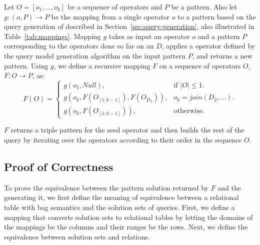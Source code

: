 \vspace*{-4pt}
\begin{sloppypar}
\begin{definition}
	Let $O = [o_1, \dots, o_k]$ be a sequence of \rdfframes operators and $P$ be a \sparql pattern.
	Also let $g: (o, P) \rightarrow P$ be the mapping from a single \rdfframes operator $o$ to a \sparql pattern based on the query generation of \rdfframes described in Section~\ref{sec:query-generation}, also illustrated in Table~\ref{tab:mappings}.
    Mapping $g$ takes as input an \rdfframes operator $o$ and a \sparql pattern $P$ corresponding to the operators done so far on an \rdfframe $D$, applies a \sparql operator defined by the query model generation algorithm on the input \sparql pattern $P$, and returns a new \sparql pattern.
	Using $g$, we define a recursive mapping $F$ on a sequence of \rdfframes operators $O$, $F: O \rightarrow P$, as: 
    \begin{equation}
      F(O)=\begin{cases}
        g(o_1, Null), & \text{if $|O| \leq 1$}.\\
        g(o_k, F(O_{[1:k-1]}), F(O_{D_2})), & {o_k = join(D_2,\ldots)}.\\
        g(o_k, F(O_{[1:k-1]})), & \text{otherwise}.
      \end{cases}
    \end{equation}
\end{definition}
\end{sloppypar}
$F$ returns a triple pattern for the seed operator and then builds the rest of the \sparql query by iterating over the \rdfframes operators according to their order in the sequence $O$.

\subsection{Proof of Correctness}
\vspace*{-3pt}
To prove the equivalence between the \sparql pattern solution returned by $F$ and the \rdfframe generating it, 
we first define the meaning of equivalence between a relational table with bag semantics and the solution sets 
of
\sparql queries.
First, we define a mapping that converts \sparql solution sets to relational tables by letting the domains of the mappings be the columns and their ranges be the rows.
Next, we define the equivalence between solution sets and relations.

